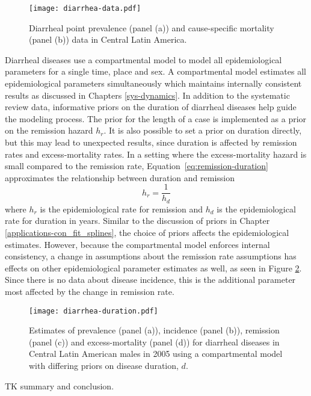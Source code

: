     \begin{figure}[h]
        \begin{center}
            \texttt{[image: diarrhea-data.pdf]}
            \caption{Diarrheal point prevalence (panel (a)) and
              cause-specific mortality (panel (b)) data in Central
              Latin America.}
            \label{fig:app-diarrhea data}
        \end{center}
    \end{figure}

Diarrheal diseases use a compartmental model to model all
epidemiological parameters for a single time, place and sex.  A
compartmental model estimates all epidemiological parameters
simultaneously which maintains internally consistent results as
discussed in Chapters \ref{sys-dynamics}.  In addition to the
systematic review data, informative priors on the duration of
diarrheal diseases help guide the modeling process.  The prior for the
length of a case is implemented as a prior on the remission hazard
$h_r$.  It is also possible to set a prior on duration directly, but
this may lead to unexpected results, since duration is affected by
remission rates and excess-mortality rates.  In a setting where the excess-mortality hazard is
small compared to the remission rate, Equation~\ref{eq:remission-duration}
approximates the relationship between duration and remission
    \begin{equation} \label{eq:remission-duration}
    	h_{r} = \frac{1}{h_{d}}
    \end{equation}
where $h_{r}$ is the epidemiological rate for remission and $h_{d}$ is
the epidemiological rate for duration in years.  Similar to the
discussion of priors in Chapter \ref{applications-con_fit_splines},
the choice of priors affects the epidemiological estimates.  However,
because the compartmental model enforces internal consistency, a
change in assumptions about the remission rate assumptions has effects
on other epidemiological parameter estimates as well, as seen in
Figure \ref{fig:app-diarrhea duration}.  Since there is no data about
disease incidence, this is the additional parameter most affected by
the change in remission rate.

    \begin{figure}[h]
        \begin{center}
            \texttt{[image: diarrhea-duration.pdf]}
            \caption{Estimates of prevalence (panel (a)), incidence
              (panel (b)), remission (panel (c)) and excess-mortality
              (panel (d)) for diarrheal diseases in Central Latin
              American males in 2005 using a compartmental model with
              differing priors on disease duration, $d$.}
            \label{fig:app-diarrhea duration}
        \end{center}
    \end{figure}

TK summary and conclusion.
